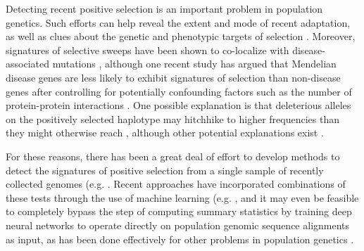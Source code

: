 Detecting recent positive selection is an important problem in population genetics. Such efforts can help reveal the extent and mode of recent adaptation, as well as clues about the genetic and phenotypic targets of selection \cite{garudRecentSelectiveSweeps2015,nielsenGenomicScansSelective2005,voightMapRecentPositive2006}. Moreover, signatures of selective sweeps have been shown to co-localize with disease-associated mutations \cite{blekhmanNaturalSelectionGenes2008,chunEvidenceHitchhikingDeleterious2011,schriderSoftSweepsAre2017}, although one recent study has argued that Mendelian disease genes are less likely to exhibit signatures of selection than non-disease genes after controlling for potentially confounding factors such as the number of protein-protein interactions \cite{diDecreasedRecentAdaptation2021}. One possible explanation is that deleterious alleles on the positively selected haplotype may hitchhike to higher frequencies than they might otherwise reach \cite{chunEvidenceHitchhikingDeleterious2011}, although other potential explanations exist \cite{corbettTransitionModernityChronic2018,ottoTwoStepsForward2004}.

For these reasons, there has been a great deal of effort to develop methods to detect the signatures of positive selection from a single sample of recently collected genomes (e.g. \cite{fayHitchhikingPositiveDarwinian2000,ferrer-admetllaDetectingIncompleteSoft2014,harrisLikelihoodApproachUncovering2020,kellyTestNeutralityBased1997,kimDetectingLocalSignature2002,kimLinkageDisequilibriumSignature2004,kimLinkageDisequilibriumSignature2004,liStatisticalFrameworkSNP2011,sabetiDetectingRecentPositive2002,voightMapRecentPositive2006}. Recent approaches have incorporated combinations of these tests through the use of machine learning (e.g. \cite{gowerDetectingAdaptiveIntrogression2021,linDistinguishingPositiveSelection2011,pybusHierarchicalBoostingMachinelearning2015,ronenLearningNaturalSelection2013,schriderHICRobustIdentification2016,sugdenLocalizationAdaptiveVariants2018}, and it may even be feasible to completely bypass the step of computing summary statistics by training deep neural networks to operate directly on population genomic sequence alignments as input, as has been done effectively for other problems in population genetics \cite{adrionPredictingLandscapeRecombination2020,chanLikelihoodFreeInferenceFramework2018,flagelUnreasonableEffectivenessConvolutional2019,sanchezDeepLearningPopulation2021}.

